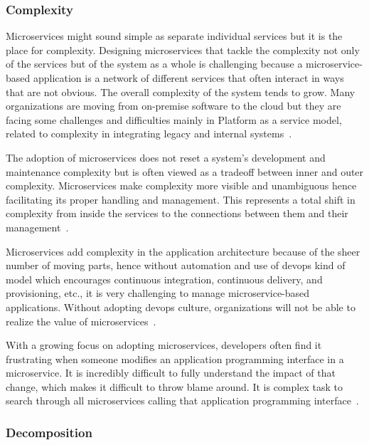 \subsubsection{Complexity}%

Microservices might sound simple as separate individual services but it is the place for complexity. Designing microservices that tackle the complexity not only of the services but of the system as a whole is challenging because a microservice-based application is a network of different services that often interact in ways that are not obvious. The overall complexity of the system tends to grow. Many organizations are moving from on-premise software to the cloud but they are facing some challenges and difficulties mainly in Platform as a service model, related to complexity in integrating legacy and internal systems~\cite{rosa2018, Zaytev2018}.

\par The adoption of microservices does not reset a system's development and maintenance complexity but is often viewed as a tradeoff between inner and outer complexity. Microservices make complexity more visible and unambiguous hence facilitating its proper handling and management. This represents a total shift in complexity from inside the services to the connections between them and their management~\cite{Ndungu2019, gozneli2020}.

\par Microservices add complexity in the application architecture because of the sheer number of moving parts, hence without automation and use of devops kind of model which encourages continuous integration, continuous delivery, and provisioning, etc., it is very challenging to manage microservice-based applications. Without adopting devops culture, organizations will not be able to realize the value of microservices~\cite{Premchand2018}. 

\par With a growing focus on adopting microservices, developers often find it frustrating when someone modifies an application programming interface in a microservice. It is incredibly difficult to fully understand the impact of that change, which makes it difficult to throw blame around. It is complex task to search through all microservices calling that application programming interface~\cite{Branko2018}.


\subsubsection{Decomposition}%

